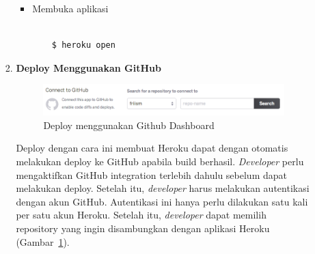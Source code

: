 \documentclass[a4paper,twoside]{article}
\begin{document}
\begin{enumerate}
\begin{enumerate}
\begin{enumerate}
\begin{itemize}
\begin{lstlisting}
\end{lstlisting}
\item Membuka aplikasi
\begin{lstlisting}

	$ heroku open

\end{lstlisting}
\end{itemize}

\item \textbf{Deploy Menggunakan GitHub}

\begin{figure}[H]
	\centering  
	\includegraphics[scale=0.5]{Gambar/deploy-github-dashboard.jpg}  
	\caption[Deploy menggunakan Github Dashboard]{Deploy menggunakan Github Dashboard} 
	\label{fig:deploy-github-dashboard} 
\end{figure}
Deploy dengan cara ini membuat Heroku dapat dengan otomatis melakukan deploy ke GitHub apabila build berhasil. \textit{Developer} perlu mengaktifkan GitHub integration terlebih dahulu sebelum dapat melakukan deploy. Setelah itu, \textit{developer} harus melakukan autentikasi dengan akun GitHub. Autentikasi ini hanya perlu dilakukan satu kali per satu akun Heroku. Setelah itu, \textit{developer} dapat memilih repository yang ingin disambungkan dengan aplikasi Heroku (Gambar~\ref{fig:deploy-github-dashboard}).


\end{enumerate}
\end{enumerate}
\end{enumerate}
\end{document}

